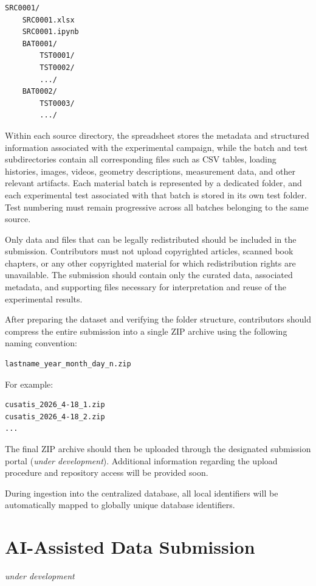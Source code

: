 \documentclass[11pt]{book}
\begin{document}
\begin{verbatim}
SRC0001/
    SRC0001.xlsx
    SRC0001.ipynb
    BAT0001/
        TST0001/
        TST0002/
        .../
    BAT0002/
        TST0003/
        .../
\end{verbatim}

Within each source directory, the spreadsheet stores the metadata and structured information associated with the experimental campaign, while the batch and test subdirectories contain all corresponding files such as CSV tables, loading histories, images, videos, geometry descriptions, measurement data, and other relevant artifacts. Each material batch is represented by a dedicated folder, and each experimental test associated with that batch is stored in its own test folder. Test numbering must remain progressive across all batches belonging to the same source.

Only data and files that can be legally redistributed should be included in the submission. Contributors must not upload copyrighted articles, scanned book chapters, or any other copyrighted material for which redistribution rights are unavailable. The submission should contain only the curated data, associated metadata, and supporting files necessary for interpretation and reuse of the experimental results.

After preparing the dataset and verifying the folder structure, contributors should compress the entire submission into a single ZIP archive using the following naming convention:

\begin{verbatim}
lastname_year_month_day_n.zip
\end{verbatim}

For example:

\begin{verbatim}
cusatis_2026_4-18_1.zip
cusatis_2026_4-18_2.zip
...
\end{verbatim}

The final ZIP archive should then be uploaded through the designated submission portal ({\emph{under development}}). Additional information regarding the upload procedure and repository access will be provided soon.

During ingestion into the centralized database, all local identifiers will be automatically mapped to globally unique database identifiers.

\section{AI-Assisted Data Submission}
{\emph{under development}}
\end{document}
